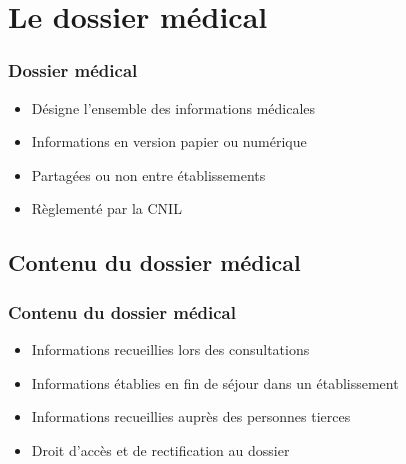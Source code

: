     \section{Le dossier médical}

\begin{frame}
\frametitle{Dossier médical}
\begin{itemize}
    \itemsep2em
    \item Désigne l'ensemble des informations médicales
    \item Informations en version papier ou numérique
    \item Partagées ou non entre établissements
    \item Règlementé par la CNIL
\end{itemize}
\end{frame}

\subsection{Contenu du dossier médical}
\begin{frame}
\frametitle{Contenu du dossier médical}
\begin{itemize}
    \itemsep2em
    \item Informations recueillies lors des consultations
    \item Informations établies en fin de séjour dans un établissement
    \item Informations recueillies auprès des personnes tierces
    \item Droit d'accès et de rectification au dossier
\end{itemize}
\end{frame}



